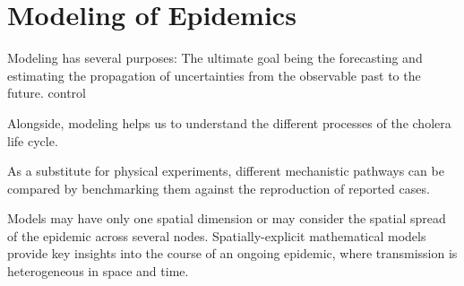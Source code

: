 \section{Modeling of Epidemics}
Modeling has several purposes:
The ultimate goal being  the forecasting and estimating the propagation of uncertainties from the observable past to the future. control

Alongside, modeling helps us to understand the different processes of the cholera life cycle. 

As a substitute for physical experiments, different mechanistic pathways can be compared by benchmarking them against the reproduction of reported cases. 

Models may have only one spatial dimension or may consider the spatial spread of the epidemic across several nodes. Spatially-explicit mathematical models provide key insights into the course of an ongoing epidemic, where transmission is heterogeneous in space and time.

